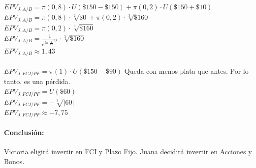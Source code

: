 \documentclass{article}
\begin{document}
        \\
        \(EPV_{J, A/B} = \pi(0,8) \cdot U(\mathdollar 150 - \mathdollar 150) + \pi(0,2) \cdot U(\mathdollar 150 + \mathdollar 10)\)
        \\
        \(EPV_{J, A/B} = \pi(0,8) \cdot \sqrt[2]{\mathdollar 0} + \pi(0,2) \cdot \sqrt[3]{\mathdollar 160}\)
        \\
        \(EPV_{J, A/B} = \pi(0,2) \cdot \sqrt[3]{\mathdollar 160}\)
        \\
        \(EPV_{J, A/B} = \frac{1}{e^{\ln{\frac{1}{0,2}}^{0,6}}} \cdot \sqrt[3]{\mathdollar 160}\)
        \\
        \(EPV_{J, A/B} \approx 1,43\)
        \\
        \\
        \(EPV_{J, FCI/PF} = \pi(1) \cdot U(\mathdollar 150 - \mathdollar 90)\) Queda con menos plata que antes. Por lo tanto, es una pérdida.
        \\
        \(EPV_{J, FCI/PF} = U(\mathdollar 60)\)
        \\
        \(EPV_{J, FCI/PF} = -\sqrt[3]{|60|}\)
        \\
        \(EPV_{J, FCI/PF} \approx -7,75\)
        \\
        \\
        \textbf{Conclusión:}
        \\
        \\
        Victoria eligirá invertir en FCI y Plazo Fijo. Juana decidirá invertir en Acciones y Bonos.
\end{document}
